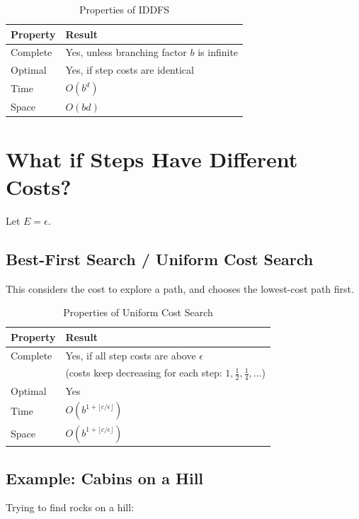 \documentclass{article}
\begin{document}
\begin{table}[h]
\centering
\begin{tabular}{@{}ll@{}}
\toprule
\textbf{Property} & \textbf{Result} \\
\midrule
Complete & Yes, unless branching factor $b$ is infinite \\
Optimal & Yes, if step costs are identical \\
Time & $O(b^d)$ \\
Space & $O(bd)$ \\
\bottomrule
\end{tabular}
\caption{Properties of IDDFS}
\end{table}

\section{What if Steps Have Different Costs?}

Let $E = \epsilon$.

\subsection{Best-First Search / Uniform Cost Search}

This considers the cost to explore a path, and chooses the lowest-cost path first.

\begin{table}[h]
\centering
\begin{tabular}{@{}ll@{}}
\toprule
\textbf{Property} & \textbf{Result} \\
\midrule
Complete & Yes, if all step costs are above $\epsilon$ \\
 & (costs keep decreasing for each step: $1, \tfrac{1}{2}, \tfrac{1}{4}, \dots$) \\
Optimal & Yes \\
Time & $O\!\left(b^{1 + \lfloor c/\epsilon \rfloor}\right)$ \\
Space & $O\!\left(b^{1 + \lfloor c/\epsilon \rfloor}\right)$ \\
\bottomrule
\end{tabular}
\caption{Properties of Uniform Cost Search}
\end{table}

\subsection{Example: Cabins on a Hill}

Trying to find rocks on a hill:
\end{document}
